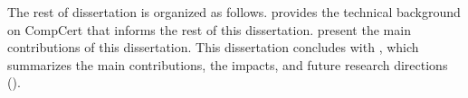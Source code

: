 The rest of dissertation is organized as follows.   provides the technical
background on CompCert that informs the rest of this dissertation.
 present the main contributions of this
dissertation.  This dissertation concludes with , which summarizes the main
contributions, the impacts, and future research directions ().





%


